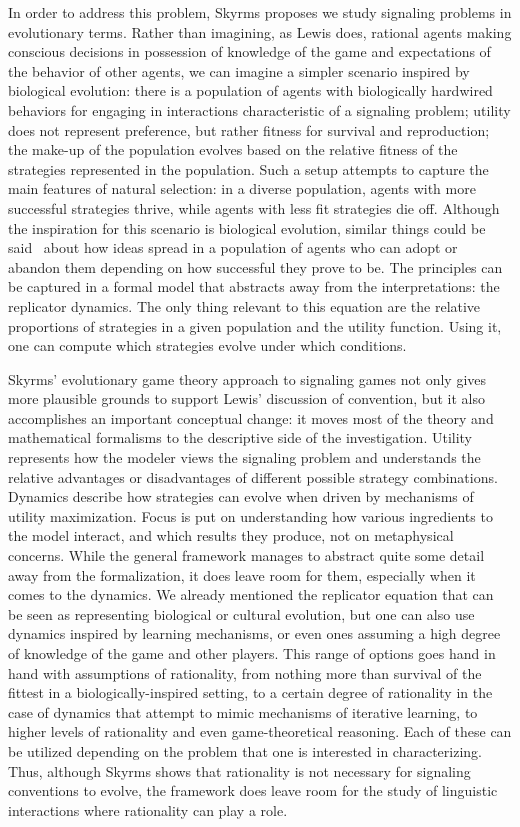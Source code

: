 \documentclass[a4paper]{article}
\begin{document}
In order to address this problem, Skyrms proposes we study signaling problems in evolutionary terms.
Rather than imagining, as Lewis does, rational agents making conscious decisions in possession of knowledge of the game and expectations of the behavior of other agents, we can imagine a simpler scenario inspired by biological evolution: there is a population of agents with biologically hardwired behaviors for engaging in interactions characteristic of a signaling problem; utility does not represent preference, but rather fitness for survival and reproduction; the make-up of the population evolves based on the relative fitness of the strategies represented in the population.
Such a setup attempts to capture the main features of natural selection: in a diverse population, agents with more successful strategies thrive, while agents with less fit strategies die off.
Although the inspiration for this scenario is biological evolution, similar things could be said~\parencite[\emph{e.g.}][]{dawkins_selfish_1978,boyd_culture_1985} about how ideas spread in a population of agents who can adopt or abandon them depending on how successful they prove to be.
The principles can be captured in a formal model that abstracts away from the interpretations: the replicator dynamics.
The only thing relevant to this equation are the relative proportions of strategies in a given population and the utility function.
Using it, one can compute which strategies evolve under which conditions.

Skyrms' evolutionary game theory approach to signaling games not only gives more plausible grounds to support Lewis' discussion of convention, but it also accomplishes an important conceptual change: it moves most of the theory and mathematical formalisms to the descriptive side of the investigation.
Utility represents how the modeler views the signaling problem and understands the relative advantages or disadvantages of different possible strategy combinations.
Dynamics describe how strategies can evolve when driven by mechanisms of utility maximization.
Focus is put on understanding how various ingredients to the model interact, and which results they produce, not on metaphysical concerns.
While the general framework manages to abstract quite some detail away from the formalization, it does leave room for them, especially when it comes to the dynamics.
We already mentioned the replicator equation that can be seen as representing biological or cultural evolution, but one can also use dynamics inspired by learning mechanisms, or even ones assuming a high degree of knowledge of the game and other players.
This range of options goes hand in hand with assumptions of rationality, from nothing more than survival of the fittest in a biologically-inspired setting, to a certain degree of rationality in the case of dynamics that attempt to mimic mechanisms of iterative learning, to higher levels of rationality and even game-theoretical reasoning.
Each of these can be utilized depending on the problem that one is interested in characterizing.
Thus, although Skyrms shows that rationality is not necessary for signaling conventions to evolve, the framework does leave room for the study of linguistic interactions where rationality can play a role.
\end{document}
